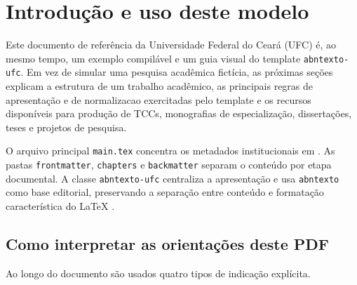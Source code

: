 \section{Introdução e uso deste modelo}\label{sec:introducao}

Este documento de referência da Universidade Federal do Ceará (UFC) é, ao mesmo tempo, um exemplo compilável e um guia visual do \gls{template} \texttt{abntexto-ufc}. Em vez de simular uma pesquisa acadêmica fictícia, as próximas seções explicam a estrutura de um trabalho acadêmico, as principais regras de apresentação e de \gls{normalizacao} exercitadas pelo template e os recursos disponíveis para produção de TCCs, monografias de especialização, dissertações, teses e projetos de pesquisa.

O arquivo principal \texttt{main.tex} concentra os metadados institucionais em \texttt{\string\ufcsetup}. As pastas \texttt{frontmatter}, \texttt{chapters} e \texttt{backmatter} separam o conteúdo por etapa documental. A classe \texttt{abntexto-ufc} centraliza a apresentação e usa \texttt{abntexto} como base editorial, preservando a separação entre conteúdo e formatação característica do \LaTeX{} \parencite{knuth,lamport1994}.

\subsection{Como interpretar as orientações deste PDF}

Ao longo do documento são usados quatro tipos de indicação explícita.





